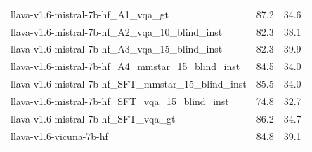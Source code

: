 \begin{tabular}{lrr}
llava-v1.6-mistral-7b-hf_A1_vqa_gt & 87.2 & 34.6 \\
llava-v1.6-mistral-7b-hf_A2_vqa_10_blind_inst & 82.3 & 38.1 \\
llava-v1.6-mistral-7b-hf_A3_vqa_15_blind_inst & 82.3 & 39.9 \\
llava-v1.6-mistral-7b-hf_A4_mmstar_15_blind_inst & 84.5 & 34.0 \\
llava-v1.6-mistral-7b-hf_SFT_mmstar_15_blind_inst & 85.5 & 34.0 \\
llava-v1.6-mistral-7b-hf_SFT_vqa_15_blind_inst & 74.8 & 32.7 \\
llava-v1.6-mistral-7b-hf_SFT_vqa_gt & 86.2 & 34.7 \\
llava-v1.6-vicuna-7b-hf & 84.8 & 39.1 \\
\bottomrule
\end{tabular}

